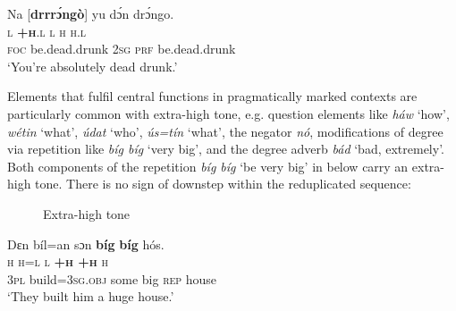 \ea%
    \label{ex:key:62}
    \glll   Na  [\textbf{drrrɔ́ngò}]    yu  dɔ́n  drɔ́ngo. \\
\textsc{l}  \textbf{\textsc{+h}}\textsc{.l}        \textsc{l}  \textsc{h}  \textsc{h.l}\\
\textsc{foc}  be.dead.drunk  \textsc{2sg}  \textsc{prf}  be.dead.drunk\\
\glt ‘You’re absolutely dead drunk.’     
\z

Elements that fulfil central functions in pragmatically marked contexts are particularly common with extra-high tone, e.g. question elements like \textit{háw} ‘how’, \textit{wétin} ‘what’, \textit{údat} ‘who’, \textit{ús=tín}  ‘what’, the negator \textit{nó}, modifications of degree via repetition like \textit{bíg bíg} ‘very big’, and the degree adverb \textit{bád} ‘bad, extremely’. Both components of the repetition \textit{bíg bíg} ‘be very big’ in  below carry an extra-high tone. There is no sign of downstep within the reduplicated sequence: 

\begin{figure}
\caption{Extra-high tone}
\label{fig:key:3.24}
\end{figure}
 


\ea%
    \label{ex:key:63}
    \glll   Dɛn    bíl=an    sɔn    \textbf{bíg}  \textbf{bíg}    hós.\\
\textsc{h}    \textsc{h=l}      \textsc{l}    \textbf{\textsc{+h}  \textbf{\textsc{+h}}}    \textsc{h}\\
\textsc{3pl}    build=\textsc{3sg.obj}  some  big  \textsc{rep}    house\\
\glt ‘They built him a huge house.’    
\z

